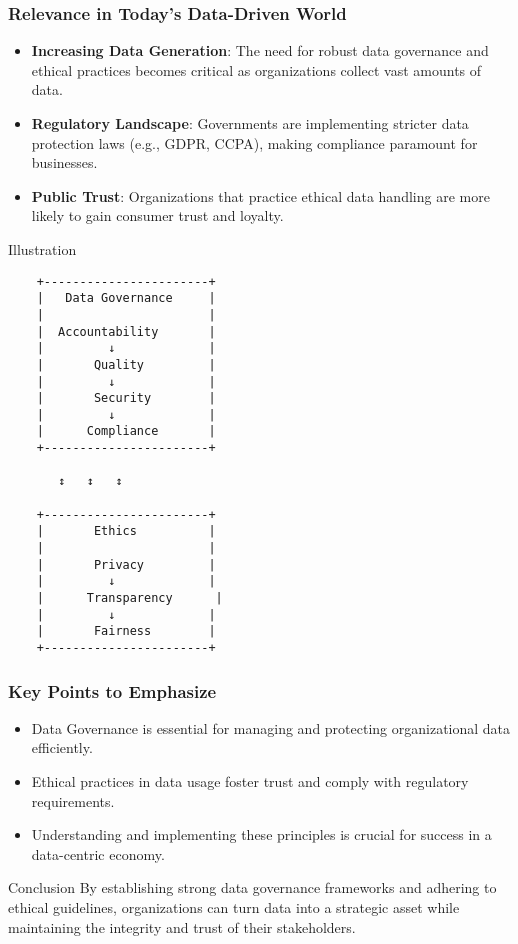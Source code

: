 \documentclass{beamer}
\begin{document}
\begin{frame}[fragile]
    \frametitle{Relevance in Today's Data-Driven World}
    \begin{itemize}
        \item \textbf{Increasing Data Generation}: The need for robust data governance and ethical practices becomes critical as organizations collect vast amounts of data.
        \item \textbf{Regulatory Landscape}: Governments are implementing stricter data protection laws (e.g., GDPR, CCPA), making compliance paramount for businesses.
        \item \textbf{Public Trust}: Organizations that practice ethical data handling are more likely to gain consumer trust and loyalty.
    \end{itemize}
    \begin{block}{Illustration}
    \begin{center}
    \begin{verbatim}
    +-----------------------+
    |   Data Governance     |
    |                       |
    |  Accountability       |
    |         ↓             |
    |       Quality         |
    |         ↓             |
    |       Security        |
    |         ↓             |
    |      Compliance       |
    +-----------------------+
    
       ↕   ↕   ↕
    
    +-----------------------+
    |       Ethics          |
    |                       |
    |       Privacy         |
    |         ↓             |
    |      Transparency      |
    |         ↓             |
    |       Fairness        |
    +-----------------------+
    \end{verbatim}
    \end{center}
    \end{block}
\end{frame}

\begin{frame}[fragile]
    \frametitle{Key Points to Emphasize}
    \begin{itemize}
        \item Data Governance is essential for managing and protecting organizational data efficiently.
        \item Ethical practices in data usage foster trust and comply with regulatory requirements.
        \item Understanding and implementing these principles is crucial for success in a data-centric economy.
    \end{itemize}
    \begin{block}{Conclusion}
        By establishing strong data governance frameworks and adhering to ethical guidelines, organizations can turn data into a strategic asset while maintaining the integrity and trust of their stakeholders.
    \end{block}
\end{frame}
\end{document}
